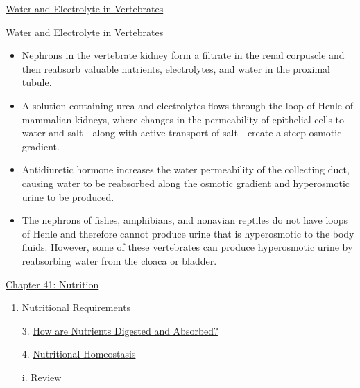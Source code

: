 \documentclass[12pt,letterpaper]{article}
\newcommand{\thetitle}{\hypertarget{home}{Animals and Ecology}}
\begin{document}
\begin{secbox}{\hyperlink{40}{Water and Electrolyte in Vertebrates}}
{\begin{itemize}
        \end{itemize}
        \hyperlink{40.5}{Water and Electrolyte in Vertebrates} 
        \begin{itemize}
            \item Nephrons in the vertebrate kidney form a filtrate in the renal corpuscle and then reabsorb valuable nutrients, electrolytes, and water in the proximal tubule. 
            \item A solution containing urea and electrolytes flows through the loop of Henle of mammalian kidneys, where changes in the permeability of epithelial cells to water and salt—along with active transport of salt—create a steep osmotic gradient. 
            \item Antidiuretic hormone increases the water permeability of the collecting duct, causing water to be reabsorbed along the osmotic gradient and hyperosmotic urine to be produced. 
            \item The nephrons of fishes, amphibians, and non­avian reptiles do not have loops of Henle and therefore cannot produce urine that is hyperosmotic to the body fluids. However, some of these vertebrates can produce hyperosmotic urine by reabsorbing water from the cloaca or bladder.
        \end{itemize}    
    }\end{secbox}


\clearpage

\renewcommand{\thetitle}{\hypertarget{41}{Nutrition}}
\hypertarget{41}{}
\setcounter{section}{41}

\begin{chapbox}{\hyperlink{home}{Chapter 41: Nutrition}}
    \begin{enumerate}
        \item \hyperlink{41.1}{Nutritional Requirements}
        \item [3.]\hyperlink{41.3}{How are Nutrients Digested and Absorbed?}
        \item [4.]\hyperlink{41.4}{Nutritional Homeostasis}
        \item [i.]\hyperlink{41.r}{Review}
    \end{enumerate}
\end{chapbox}
\end{document}
